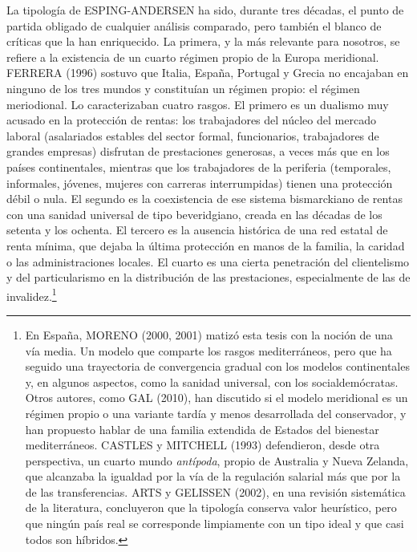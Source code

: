 \documentclass[10pt,a4paper]{article}
\begin{document}
La tipología de ESPING-ANDERSEN ha sido, durante tres décadas, el punto de partida obligado de cualquier análisis comparado, pero también el blanco de críticas que la han enriquecido. La primera, y la más relevante para nosotros, se refiere a la existencia de un cuarto régimen propio de la Europa meridional. FERRERA (1996) sostuvo que Italia, España, Portugal y Grecia no encajaban en ninguno de los tres mundos y constituían un régimen propio: el régimen meriodional. Lo caracterizaban cuatro rasgos. El primero es un dualismo muy acusado en la protección de rentas: los trabajadores del núcleo del mercado laboral (asalariados estables del sector formal, funcionarios, trabajadores de grandes empresas) disfrutan de prestaciones generosas, a veces más que en los países continentales, mientras que los trabajadores de la periferia (temporales, informales, jóvenes, mujeres con carreras interrumpidas) tienen una protección débil o nula. El segundo es la coexistencia de ese sistema bismarckiano de rentas con una sanidad universal de tipo beveridgiano, creada en las décadas de los setenta y los ochenta. El tercero es la ausencia histórica de una red estatal de renta mínima, que dejaba la última protección en manos de la familia, la caridad o las administraciones locales. El cuarto es una cierta penetración del clientelismo y del particularismo en la distribución de las prestaciones, especialmente de las de invalidez.\footnote{En España, MORENO (2000, 2001) matizó esta tesis con la noción de una vía media. Un modelo que comparte los rasgos mediterráneos, pero que ha seguido una trayectoria de convergencia gradual con los modelos continentales y, en algunos aspectos, como la sanidad universal, con los socialdemócratas. Otros autores, como GAL (2010), han discutido si el modelo meridional es un régimen propio o una variante tardía y menos desarrollada del conservador, y han propuesto hablar de una familia extendida de Estados del bienestar mediterráneos. CASTLES y MITCHELL (1993) defendieron, desde otra perspectiva, un cuarto mundo \textit{antípoda}, propio de Australia y Nueva Zelanda, que alcanzaba la igualdad por la vía de la regulación salarial más que por la de las transferencias. ARTS y GELISSEN (2002), en una revisión sistemática de la literatura, concluyeron que la tipología conserva valor heurístico, pero que ningún país real se corresponde limpiamente con un tipo ideal y que casi todos son híbridos.
}
\end{document}
